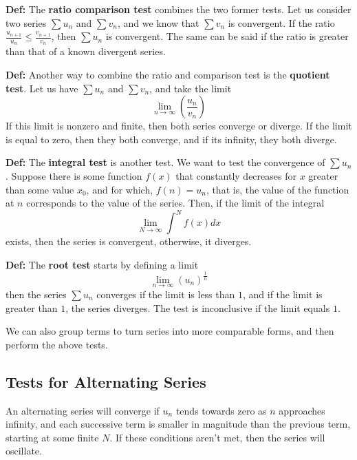 \documentclass{article}
\begin{document}
\textbf{Def:} The \textbf{ratio comparison test} combines the two former tests. Let us consider two series $\sum u_n$ and $\sum v_n$, and we know that $\sum v_n$ is convergent. If the ratio $\frac{u_{n+1}}{u_n} \leq \frac{v_{n+1}}{v_n}$, then $\sum u_n$ is convergent. The same can be said if the ratio is greater than that of a known divergent series. 

\textbf{Def:} Another way to combine the ratio and comparison test is the \textbf{quotient test}. Let us have $\sum u_n$ and $\sum v_n$, and take the limit $$\lim_{n \to \infty}(\frac{u_n}{v_n})$$If this limit is nonzero and finite, then both series converge or diverge. If the limit is equal to zero, then they both converge, and if its infinity, they both diverge. 

\textbf{Def:} The \textbf{integral test} is another test. We want to test the convergence of $\sum u_n$. Suppose there is some function $f(x)$ that constantly decreases for $x$ greater than some value $x_0$, and for which, $f(n) = u_n$, that is, the value of the function at $n$ corresponds to the value of the series. Then, if the limit of the integral $$\lim_{N \to \infty} \int^{N} f(x) dx$$ exists, then the series is convergent, otherwise, it diverges. 

\textbf{Def:} The \textbf{root test} starts by defining a limit $$\lim_{n\to\infty}(u_n)^{\frac{1}{n}}$$then the series $\sum u_n$ converges if the limit is less than $1$, and if the limit is greater than $1$, the series diverges. The test is inconclusive if the limit equals $1$. 

We can also group terms to turn series into more comparable forms, and then perform the above tests. 

\subsection{Tests for Alternating Series}

An alternating series will converge if $u_n$ tends towards zero as $n$ approaches infinity, and each successive term is smaller in magnitude than the previous term, starting at some finite $N$. If these conditions aren't met, then the series will oscillate. 
\end{document}

